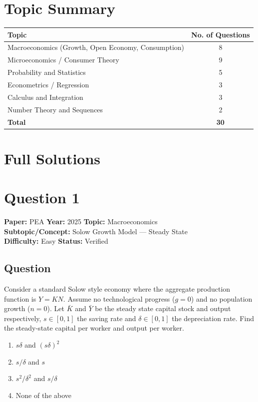 \documentclass[11pt]{article}
\begin{document}
\newpage

\section*{Topic Summary}

\begin{center}
\begin{tabular}{l c}
\toprule
Topic & No. of Questions \\
\midrule
Macroeconomics (Growth, Open Economy, Consumption) & 8 \\
Microeconomics / Consumer Theory & 9 \\
Probability and Statistics & 5 \\
Econometrics / Regression & 3 \\
Calculus and Integration & 3 \\
Number Theory and Sequences & 2 \\
\midrule
\textbf{Total} & \textbf{30} \\
\bottomrule
\end{tabular}
\end{center}

\newpage

\section*{Full Solutions}

\section*{Question 1}
\textbf{Paper:} PEA \quad \textbf{Year:} 2025 \quad \textbf{Topic:} Macroeconomics \\
\textbf{Subtopic/Concept:} Solow Growth Model --- Steady State \\
\textbf{Difficulty:} Easy \quad \textbf{Status:} Verified

\subsection*{Question}
Consider a standard Solow style economy where the aggregate production function is $Y = KN$. Assume no technological progress ($g=0$) and no population growth ($n=0$). Let $\bar K$ and $\bar Y$ be the steady state capital stock and output respectively, $s \in [0,1]$ the saving rate and $\delta \in [0,1]$ the depreciation rate. Find the steady-state capital per worker and output per worker.
\begin{enumerate}[label=(\Alph*)]
\item $s\delta$ and $(s\delta)^2$
\item $s/\delta$ and $s$
\item $s^2/\delta^2$ and $s/\delta$
\item None of the above
\end{enumerate}
\end{document}
